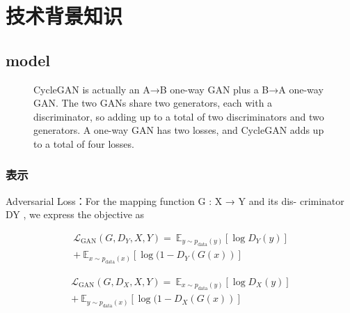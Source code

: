 \chapter{\heiti \label{ch2}技术背景知识}
\section{\heiti model}

\begin{figure}[thb]
  \centering
  \caption{CycleGAN is actually an A→B one-way GAN plus a B→A one-way GAN. The two GANs share two generators, each with a discriminator, so adding up to a total of two discriminators and two generators. A one-way GAN has two losses, and CycleGAN adds up to a total of four losses.}
  \label{fig:PGM1}
  \end{figure}

\subsection{\heiti 表示}
Adversarial Loss：For the mapping function G : X → Y and its dis- criminator DY , we express the objective as

\begin{align}
\mathcal{L}_{\text{GAN}}(G,D_Y,X,Y) =  \ \mathbb{E}_{y \sim p_{\text{data}}(y)}[\log D_Y(y)] \nonumber \\
+  \ \mathbb{E}_{x \sim p_{\text{data}}(x)}[\log (1-D_Y(G(x))]
\end{align}

\begin{align}
  \mathcal{L}_{\text{GAN}}(G,D_X,X,Y) =  \ \mathbb{E}_{x \sim p_{\text{data}}(y)}[\log D_X(y)] \nonumber \\
  +  \ \mathbb{E}_{y \sim p_{\text{data}}(x)}[\log (1-D_X(G(x))]
  \end{align}

